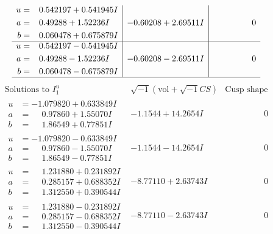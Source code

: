 \documentclass[1p]{elsarticle_modified}
\theoremstyle{definition}
\newcommand{\I}{\sqrt{-1}}
\begin{document}
$$\begin{array}{c|c|c}
\begin{aligned}
u &= \phantom{-}0.542197 + 0.541945 I \\
a &= \phantom{-}0.49288 + 1.52236 I \\
b &= \phantom{-}0.060478 + 0.675879 I\end{aligned}
 & -0.60208 + 2.69511 I & \phantom{-0.000000 } 0 \\ \hline\begin{aligned}
u &= \phantom{-}0.542197 - 0.541945 I \\
a &= \phantom{-}0.49288 - 1.52236 I \\
b &= \phantom{-}0.060478 - 0.675879 I\end{aligned}
 & -0.60208 - 2.69511 I & \phantom{-0.000000 } 0\\
 \hline 
 \end{array}$$\newpage$$\begin{array}{c|c|c}  
\text{Solutions to }I^u_{1}& \I (\text{vol} + \sqrt{-1}CS) & \text{Cusp shape}\\
 \hline 
\begin{aligned}
u &= -1.079820 + 0.633849 I \\
a &= \phantom{-}0.97860 + 1.55070 I \\
b &= \phantom{-}1.86549 + 0.77851 I\end{aligned}
 & -1.1544 + 14.2654 I & \phantom{-0.000000 } 0 \\ \hline\begin{aligned}
u &= -1.079820 - 0.633849 I \\
a &= \phantom{-}0.97860 - 1.55070 I \\
b &= \phantom{-}1.86549 - 0.77851 I\end{aligned}
 & -1.1544 - 14.2654 I & \phantom{-0.000000 } 0 \\ \hline\begin{aligned}
u &= \phantom{-}1.231880 + 0.231892 I \\
a &= \phantom{-}0.285157 + 0.688352 I \\
b &= \phantom{-}1.312550 + 0.390544 I\end{aligned}
 & -8.77110 + 2.63743 I & \phantom{-0.000000 } 0 \\ \hline\begin{aligned}
u &= \phantom{-}1.231880 - 0.231892 I \\
a &= \phantom{-}0.285157 - 0.688352 I \\
b &= \phantom{-}1.312550 - 0.390544 I\end{aligned}
 & -8.77110 - 2.63743 I & \phantom{-0.000000 } 0 \\ \hline\begin{aligned}

\end{aligned}
\end{array}$$
\end{document}
